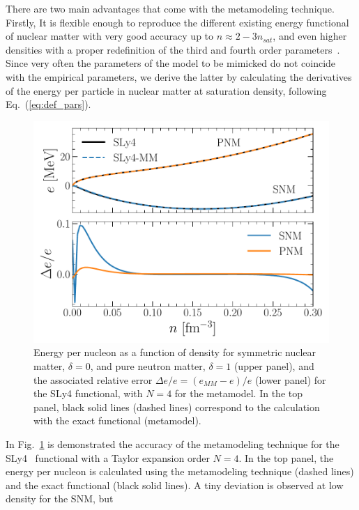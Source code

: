 There are two main advantages that come with the metamodeling technique.\\
Firstly, It is flexible enough to reproduce the different existing energy functional of 
nuclear matter with very good accuracy up to $n \approx 2-3n_{sat}$, and even higher
densities with a proper redefinition of the third and fourth order 
parameters~\cite{Margueron2018a}. Since very often the
parameters of the model to be mimicked do not coincide with the empirical
parameters, we derive the latter by calculating the derivatives of the energy 
per particle in nuclear matter at saturation density, following
Eq.~(\ref{eq:def_pars}).
%
\begin{figure}[!t]
\begin{center}
  \includegraphics[width=0.9\linewidth]{figures/mm_accuracy.pdf}
\end{center}
\caption[Accuracy of the metamodeling technique for SLy4]{Energy per 
  nucleon as a function of density for symmetric
  nuclear matter, $\delta=0$, and pure neutron matter, $\delta=1$ (upper panel), and the
associated relative error $\Delta e/e = (e_{MM} - e)/e$ (lower panel) for the SLy4
functional, with $N=4$ for the metamodel. In the top panel, black solid lines 
(dashed lines) correspond to the
calculation with the exact functional (metamodel).}\label{fig:mm_accuracy}
\end{figure}
%
In Fig.~\ref{fig:mm_accuracy} is demonstrated the accuracy of the metamodeling
technique for the SLy4~\cite{Chabanat1998} functional with a Taylor expansion 
order $N=4$. In the top panel, the energy per nucleon is calculated 
using the metamodeling technique (dashed lines) and the exact functional (black
solid lines). A tiny deviation is observed at low density for the SNM, but 
